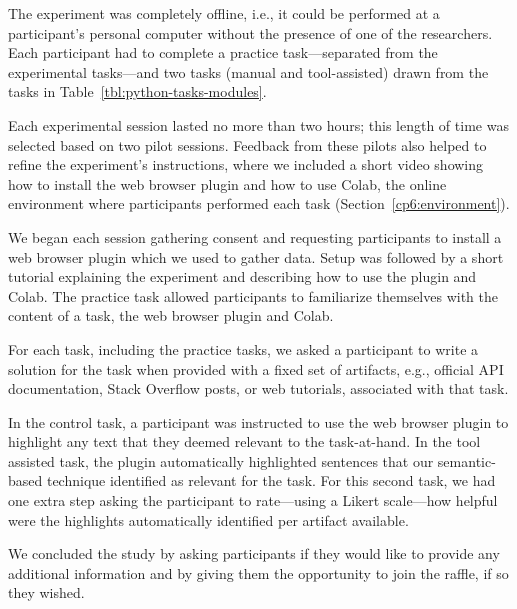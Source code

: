 The experiment was completely offline, i.e., it could be performed at a participant's personal computer
without the presence of one of the researchers. Each participant had to complete a practice task---separated from the experimental tasks---and two tasks (manual and tool-assisted) drawn from the tasks in Table~\ref{tbl:python-tasks-modules}. 


Each experimental session lasted no more than two hours; this length of time was selected based on two pilot sessions. 
Feedback from these pilots also helped to refine the experiment's instructions, where we included a short video showing how to install the web browser plugin and how to use Colab, the online environment where participants performed each task (Section~\ref{cp6:environment}).






We began each session gathering consent and requesting participants to install a web browser plugin which we used to gather data.
Setup was followed by a short tutorial explaining the experiment and describing how to use the plugin and Colab. 
The practice task allowed participants to familiarize themselves with the content of a task, the web browser plugin and Colab. 



For each task, including the practice tasks, we asked a participant to write a solution for the task
when provided with a fixed set of artifacts, e.g., official API documentation, Stack Overflow posts, or web tutorials, 
associated with that task.  


In the control task, a participant was instructed to use the web browser plugin to highlight any text that they deemed relevant to the task-at-hand. 
In the tool assisted task, the plugin automatically highlighted sentences that our semantic-based technique identified as relevant for the task. 
For this second task, we had one extra step asking the participant to rate---using a Likert scale---how helpful were the highlights automatically identified per artifact available. 


We concluded the study by asking participants if they would like to provide any additional information and 
by giving them the opportunity to join the raffle, if so they wished. 



